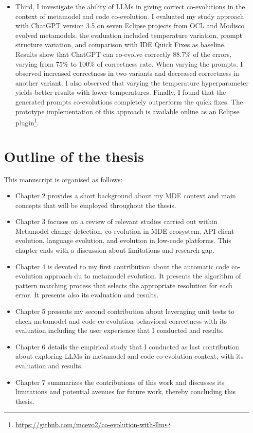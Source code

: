 \begin{itemize}[label=]
	\item Third, I investigate the ability of LLMs in giving correct co-evolutions in the context of metamodel and code co-evolution. I evaluated my study approach with ChatGPT version 3.5 on seven Eclipse projects
		from OCL and Modisco evolved metamodels. the evaluation included temperature variation, prompt structure variation, and comparison with IDE Quick Fixes as baseline. Results show that ChatGPT can co-evolve correctly 88.7\% of the errors, varying from 75\% to 100\% of correctness rate. When varying the prompts, I observed increased
		correctness in two variants and decreased correctness in another variant. I also observed that varying the temperature
		hyperparameter yields better results with lower temperatures. Finally, I found that the generated prompts co-evolutions completely outperform the quick fixes.  The prototype implementation of this approach is available online as an Eclipse plugin\footnote{\url{https://github.com/mcevo2/co-evolution-with-llm}}.


\end{itemize}


\section{Outline of the thesis}
This manuscript is organised as follows:
\begin{itemize}[label=\textbullet,font=\small]

\item Chapter 2 provides a short background about my MDE context and main concepts that will be employed throughout the thesis.
\item Chapter 3 focuses on a review of relevant studies carried out within Metamodel change detection, co-evolution in MDE ecosystem, API-client evolution, language evolution, and evolution in low-code platforms. This chapter ends with a discussion about limitations and research gap.
\item Chapter 4 is devoted to my first contribution about the automatic code co-evolution approach du to metamodel evolution. It presents the algorithm of pattern matching process that selects the appropriate resolution for each error. It presents also its evaluation and results.
\item Chapter 5 presents my second contribution about leveraging unit tests to check metamodel and code co-evolution behavioral correctness with its evaluation including the user experience that I conducted and results.
\item Chapter 6 details the empirical study that I conducted as last contribution about exploring LLMs in metamodel and code co-evolution context, with its evaluation and results.
\item Chapter 7 summarizes the contributions of this work and discusses its limitations and  potential avenues for future work, thereby concluding this thesis.

\end{itemize}

